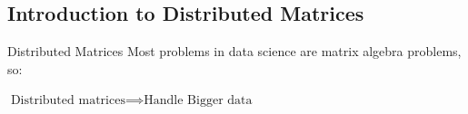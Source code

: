 \subsection{Introduction to Distributed Matrices}

\begin{frame}
  \begin{block}{Distributed Matrices}\pause
  Most problems in data science are matrix algebra problems, so:
  \begin{center}
  $\text{Distributed matrices} \implies \text{Handle Bigger data}$
  \end{center}
  \end{block}
\end{frame}


% 
% 



